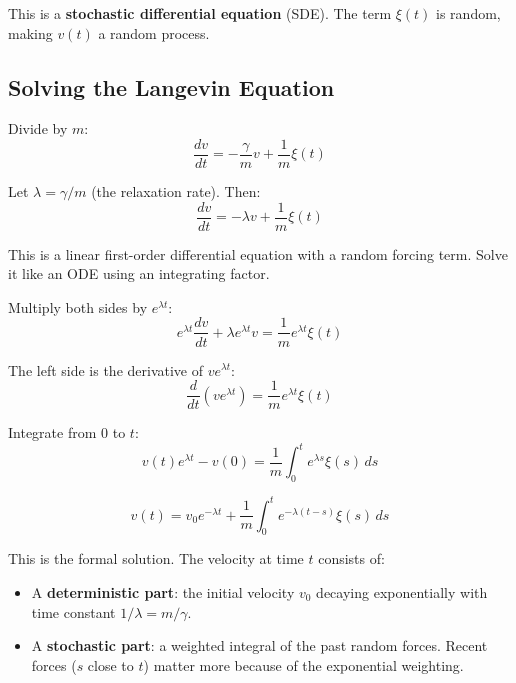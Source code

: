 \documentclass[11pt,a4paper]{article}
\begin{document}
	This is a \textbf{stochastic differential equation} (SDE). The term $\xi(t)$ is random, making $v(t)$ a random process.
	
	\subsection{Solving the Langevin Equation}
	
	Divide by $m$:
	\begin{equation}
		\frac{dv}{dt} = -\frac{\gamma}{m} v + \frac{1}{m} \xi(t)
	\end{equation}
	
	Let $\lambda = \gamma / m$ (the relaxation rate). Then:
	\begin{equation}
		\frac{dv}{dt} = -\lambda v + \frac{1}{m} \xi(t)
	\end{equation}
	
	This is a linear first-order differential equation with a random forcing term. Solve it like an ODE using an integrating factor.
	
	Multiply both sides by $e^{\lambda t}$:
	\begin{equation}
		e^{\lambda t} \frac{dv}{dt} + \lambda e^{\lambda t} v = \frac{1}{m} e^{\lambda t} \xi(t)
	\end{equation}
	
	The left side is the derivative of $v e^{\lambda t}$:
	\begin{equation}
		\frac{d}{dt}\left(v e^{\lambda t}\right) = \frac{1}{m} e^{\lambda t} \xi(t)
	\end{equation}
	
	Integrate from $0$ to $t$:
	\begin{equation}
		v(t) e^{\lambda t} - v(0) = \frac{1}{m} \int_0^t e^{\lambda s} \xi(s) \, ds
	\end{equation}
	
	\begin{equation}
		\boxed{v(t) = v_0 e^{-\lambda t} + \frac{1}{m} \int_0^t e^{-\lambda(t-s)} \xi(s) \, ds}
	\end{equation}
	
	This is the formal solution. The velocity at time $t$ consists of:
	\begin{itemize}
		\item A \textbf{deterministic part}: the initial velocity $v_0$ decaying exponentially with time constant $1/\lambda = m/\gamma$.
		\item A \textbf{stochastic part}: a weighted integral of the past random forces. Recent forces ($s$ close to $t$) matter more because of the exponential weighting.
	\end{itemize}
	
\end{document}
